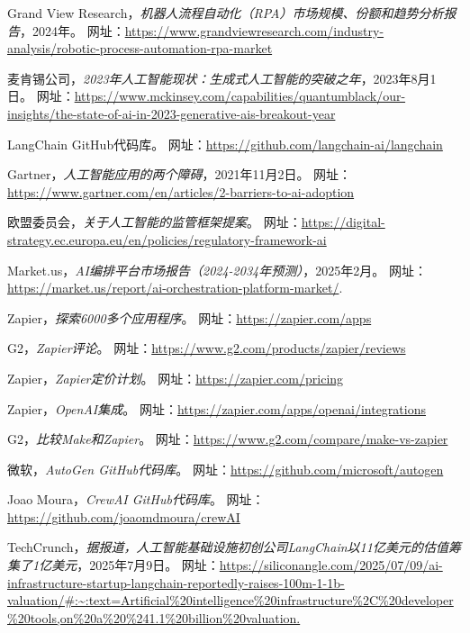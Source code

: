 \documentclass[11pt, a4paper, oneside]{article}
\begin{document}
\begin{thebibliography}{99}
    Grand View Research，\textit{机器人流程自动化（RPA）市场规模、份额和趋势分析报告}，2024年。
    网址：\url{https://www.grandviewresearch.com/industry-analysis/robotic-process-automation-rpa-market}

    麦肯锡公司，\textit{2023年人工智能现状：生成式人工智能的突破之年}，2023年8月1日。
    网址：\url{https://www.mckinsey.com/capabilities/quantumblack/our-insights/the-state-of-ai-in-2023-generative-ais-breakout-year}


    LangChain GitHub代码库。
    网址：\url{https://github.com/langchain-ai/langchain}

    Gartner，\textit{人工智能应用的两个障碍}，2021年11月2日。
    网址：\url{https://www.gartner.com/en/articles/2-barriers-to-ai-adoption}

    欧盟委员会，\textit{关于人工智能的监管框架提案}。
    网址：\url{https://digital-strategy.ec.europa.eu/en/policies/regulatory-framework-ai}

    Market.us，\textit{AI编排平台市场报告（2024-2034年预测）}，2025年2月。
    网址：\url{https://market.us/report/ai-orchestration-platform-market/}.

    Zapier，\textit{探索6000多个应用程序}。
    网址：\url{https://zapier.com/apps}

    G2，\textit{Zapier评论}。
    网址：\url{https://www.g2.com/products/zapier/reviews}

    Zapier，\textit{Zapier定价计划}。
    网址：\url{https://zapier.com/pricing}


    Zapier，\textit{OpenAI集成}。
    网址：\url{https://zapier.com/apps/openai/integrations}

    G2，\textit{比较Make和Zapier}。
    网址：\url{https://www.g2.com/compare/make-vs-zapier}


    微软，\textit{AutoGen GitHub代码库}。
    网址：\url{https://github.com/microsoft/autogen}

    Joao Moura，\textit{CrewAI GitHub代码库}。
    网址：\url{https://github.com/joaomdmoura/crewAI}

    TechCrunch，\textit{据报道，人工智能基础设施初创公司LangChain以11亿美元的估值筹集了1亿美元}，2025年7月9日。
    网址：\url{https://siliconangle.com/2025/07/09/ai-infrastructure-startup-langchain-reportedly-raises-100m-1-1b-valuation/#:~:text=Artificial%20intelligence%20infrastructure%2C%20developer%20tools,on%20a%20%241.1%20billion%20valuation.}


\end{thebibliography}
\end{document}
